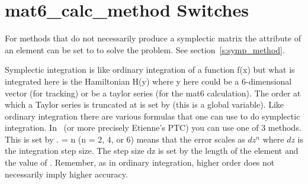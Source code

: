 \vfill \break

\section{mat6\_calc\_method Switches}
\label{s:xfer}

For methods that do not necessarily produce a symplectic matrix the
 attribute of an element can be set to  to
solve the problem. See section~\ref{s:symp_method}. 

Symplectic integration is like ordinary integration of a function f(x)
but what is integrated here is the Hamiltonian H(y) where y here could
be a 6-dimensional vector (for tracking) or be a taylor series (for
the mat6 calculation). The order at which a Taylor series is truncated
at is set by  (this is a global variable). Like
ordinary integration there are various formulas that one can use to do
symplectic integration. In \bmad\ (or more precisely Etienne's PTC)
you can use one of 3 methods. This is set by . 
 = n (n = 2, 4, or 6)
means that the error scales as $dz^n$ where $dz$ is the integration step
size. The step size dz is set by the length of the element and the
value of . Remember, as in ordinary integration, higher
order does not necessarily imply higher accuracy.

